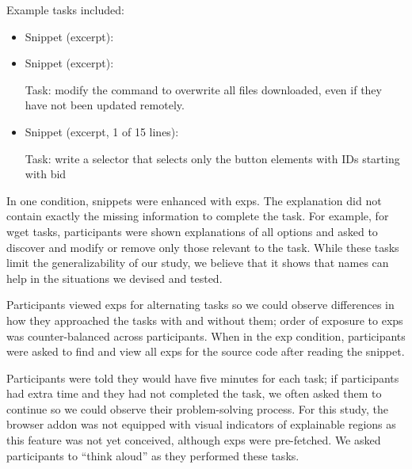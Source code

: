 Example tasks included:
\begin{itemize}

\item
Snippet (excerpt):

\item
Snippet (excerpt):


Task: modify the command to overwrite all files downloaded, even if they have not been updated remotely.

\item

Snippet (excerpt, 1 of 15 lines):


Task: write a selector that selects only the button elements with IDs starting with bid

\end{itemize}
\fi
%
\begin{changes}
In one condition, snippets were enhanced with \glspl{exp}.
The explanation did not contain exactly the missing information to complete the task.
For example, for wget tasks, participants were shown explanations of all options and asked to discover and modify or remove only those relevant to the task.
While these tasks limit the generalizability of our study, we believe that it shows that \Glspl{name} can help in the situations we devised and tested.

Participants viewed \glspl{exp} for alternating tasks so we could observe differences in how they approached the tasks with and without them; order of exposure to \glspl{exp} was counter-balanced across participants. 
When in the \gls{exp} condition, participants were asked to find and view all \glspl{exp} for the source code after reading the snippet.

Participants were told they would have five minutes for each task; if participants had extra time and they had not completed the task, we often asked them to continue so we could observe their problem-solving process.
For this study, the browser addon was not equipped with visual indicators of explainable regions as this feature was not yet conceived, although \glspl{exp} were pre-fetched.
We asked participants to ``think aloud'' as they performed these tasks.

\end{changes}

